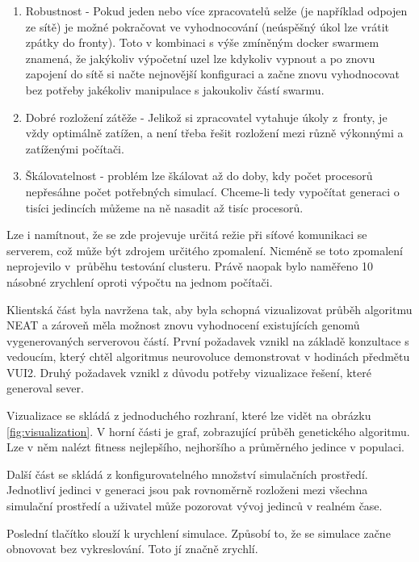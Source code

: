 \begin{enumerate}
	\item Robustnost - Pokud jeden nebo více zpracovatelů selže (je například odpojen ze sítě) je možné pokračovat ve vyhodnocování (neúspěšný úkol lze vrátit zpátky do fronty). Toto v kombinaci s výše zmíněným docker swarmem znamená, že jakýkoliv výpočetní uzel lze kdykoliv vypnout a po znovu zapojení do sítě si načte nejnovější konfiguraci a začne znovu vyhodnocovat bez potřeby jakékoliv manipulace s jakoukoliv částí swarmu.
	\item Dobré rozložení zátěže - Jelikož si zpracovatel vytahuje úkoly z~fronty, je vždy optimálně zatížen, a není třeba řešit rozložení mezi různě výkonnými a zatíženými počítači.
	\item Škálovatelnost - problém lze škálovat až do doby, kdy počet procesorů nepřesáhne počet potřebných simulací. Chceme-li tedy vypočítat generaci o tisíci jedincích můžeme na ně nasadit až tisíc procesorů.
\end{enumerate}

Lze i namítnout, že se zde projevuje určitá režie při síťové komunikaci se serverem, což může být zdrojem určitého zpomalení. Nicméně se toto zpomalení neprojevilo v~průběhu testování clusteru. Právě naopak bylo naměřeno 10 násobné zrychlení oproti výpočtu na jednom počítači.

Klientská část byla navržena tak, aby byla schopná vizualizovat průběh algoritmu NEAT a zároveň měla možnost znovu vyhodnocení existujících genomů vygenerovaných serverovou částí. První požadavek vznikl na základě konzultace s vedoucím, který chtěl algoritmus neurovoluce demonstrovat v hodinách předmětu VUI2. Druhý požadavek vznikl z důvodu potřeby vizualizace řešení, které generoval sever.

Vizualizace se skládá z jednoduchého rozhraní, které lze vidět na obrázku \ref{fig:visualization}. V horní části je graf, zobrazující průběh genetického algoritmu. Lze v něm nalézt fitness nejlepšího, nejhoršího a průměrného jedince v populaci.

Další část se skládá z konfigurovatelného množství simulačních prostředí. Jednotliví jedinci v generaci jsou pak rovnoměrně rozloženi mezi všechna simulační prostředí a uživatel může pozorovat vývoj jedinců v realném čase.

Poslední tlačítko slouží k urychlení simulace. Způsobí to, že se simulace začne obnovovat bez vykreslování. Toto jí značně zrychlí.

